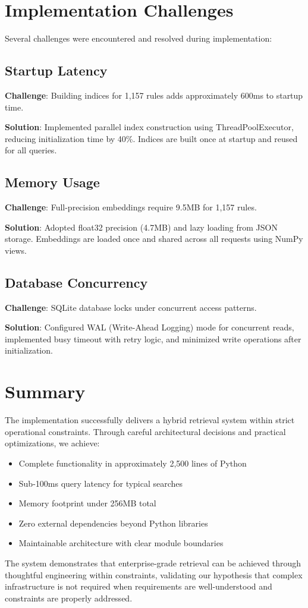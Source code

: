 \section{Implementation Challenges}

Several challenges were encountered and resolved during implementation:

\subsection{Startup Latency}

\textbf{Challenge}: Building indices for 1,157 rules adds approximately 600ms to startup time.

\textbf{Solution}: Implemented parallel index construction using ThreadPoolExecutor, reducing initialization time by 40\%. Indices are built once at startup and reused for all queries.

\subsection{Memory Usage}

\textbf{Challenge}: Full-precision embeddings require 9.5MB for 1,157 rules.

\textbf{Solution}: Adopted float32 precision (4.7MB) and lazy loading from JSON storage. Embeddings are loaded once and shared across all requests using NumPy views.

\subsection{Database Concurrency}

\textbf{Challenge}: SQLite database locks under concurrent access patterns.

\textbf{Solution}: Configured WAL (Write-Ahead Logging) mode for concurrent reads, implemented busy timeout with retry logic, and minimized write operations after initialization.

\section{Summary}

The implementation successfully delivers a hybrid retrieval system within strict operational constraints. Through careful architectural decisions and practical optimizations, we achieve:

\begin{itemize}[leftmargin=*,itemsep=3pt,topsep=3pt]
  \item Complete functionality in approximately 2,500 lines of Python
  \item Sub-100ms query latency for typical searches
  \item Memory footprint under 256MB total
  \item Zero external dependencies beyond Python libraries
  \item Maintainable architecture with clear module boundaries
\end{itemize}

The system demonstrates that enterprise-grade retrieval can be achieved through thoughtful engineering within constraints, validating our hypothesis that complex infrastructure is not required when requirements are well-understood and constraints are properly addressed.
